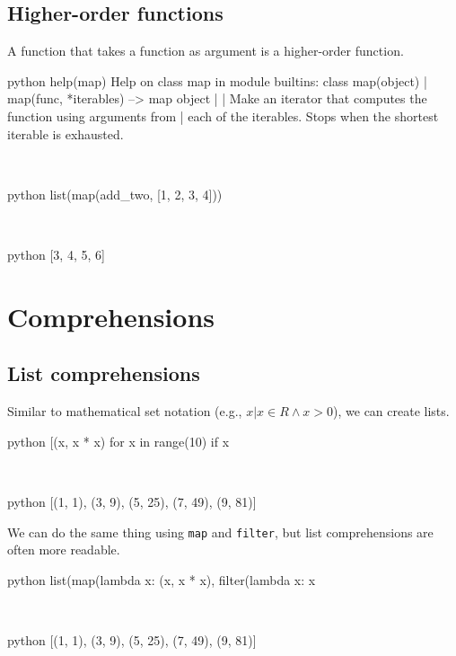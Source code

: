 \documentclass[aspectratio=1610,slidestop]{beamer}
\begin{document}
\subsection{Higher-order functions}
\begin{pframe}
 A function that takes a function as argument is a higher-order function.
 \begin{ipython}
  \begin{pythonin}{python}
help(map)
Help on class map in module builtins:
class map(object)
 |  map(func, *iterables) --> map object
 |
 |  Make an iterator that computes the function using arguments from
 |  each of the iterables.  Stops when the shortest iterable is exhausted.
  \end{pythonin}
  \\

 \begin{pythonin}{python}
list(map(add_two, [1, 2, 3, 4]))
  \end{pythonin}
  \\
  \begin{pythonout}{python}
[3, 4, 5, 6]
  \end{pythonout}
 \end{ipython}
\end{pframe}



\section{Comprehensions}

\subsection{List comprehensions}
\begin{pframe}
 Similar to mathematical set notation (e.g., ${x | x \in R \wedge x>0}$), we can create lists.
 \begin{ipython}
  \begin{pythonin}{python}
[(x, x * x) for x in range(10) if x %
  \end{pythonin}
  \\

  \begin{pythonout}{python}
[(1, 1), (3, 9), (5, 25), (7, 49), (9, 81)]
  \end{pythonout}
 \end{ipython}

We can do the same thing using \texttt{map} and \texttt{filter}, but list comprehensions are often more readable.

 \begin{ipython}
  \begin{pythonin}{python}
list(map(lambda x: (x, x * x), filter(lambda x: x %
  \end{pythonin}
  \\

  \begin{pythonout}{python}
[(1, 1), (3, 9), (5, 25), (7, 49), (9, 81)]
  \end{pythonout}
 \end{ipython}
\end{pframe}
\end{document}
